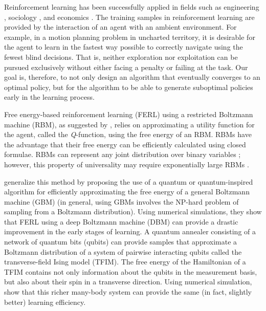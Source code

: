 \documentclass[pra,twocolumn,floatfix,superscriptaddress]{revtex4}
\begin{document}
Reinforcement learning \cite{sutton-book, bertsekas1996neuro} has been  successfully applied  in fields such as engineering \cite{derhami2013applying, syafiie2007model}, sociology \cite{erev1998predicting, shteingart2014reinforcement}, and economics \cite{matsui2011compound, sui2010reinforcement}. 
The training samples in reinforcement learning are provided by the interaction of an agent with an ambient environment. For example, in a motion planning problem in uncharted territory, it is desirable for the agent to learn in the fastest way possible to correctly navigate using the fewest blind decisions. That is, neither exploration nor exploitation can be pursued exclusively without either facing a penalty or failing at the task. Our goal is, therefore, to not only design an algorithm that eventually converges to an optimal policy, but for the algorithm to be able to generate suboptimal policies early in the learning process. 

Free energy-based reinforcement learning (FERL) using a restricted Boltzmann machine (RBM), as suggested by \citet{hintonRBM}, relies on approximating a utility function for the agent, called the \emph{Q}-function, using the free energy of an RBM. RBMs have the advantage that their free energy can be efficiently calculated using closed formulae. RBMs can represent any joint distribution over binary variables \cite{martens2013representational, hornik1989multilayer, le2008representational}; however, this property of universality may require exponentially large RBMs \cite{martens2013representational, le2008representational}. 

\citet{2016arXiv161205695C} generalize this method by proposing the use of a quantum or quantum-inspired algorithm for efficiently approximating the free energy of a general Boltzmann machine (GBM) (in general, using GBMs involves the NP-hard problem of sampling from a Boltzmann distribution).
Using numerical simulations, they show that FERL using a deep Boltzmann machine (DBM) can provide a drastic improvement in the early stages of learning. A quantum annealer consisting of a network of quantum bits (qubits) can provide samples that approximate a Boltzmann distribution of a system of pairwise interacting qubits called the transverse-field Ising model (TFIM). The free energy of the Hamiltonian of a TFIM contains not only information about the qubits in the measurement basis, but also about their spin in a transverse direction. Using numerical simulation, \cite{2016arXiv161205695C} show that this richer many-body system can provide the same (in fact, slightly better) learning efficiency. 
\end{document}
